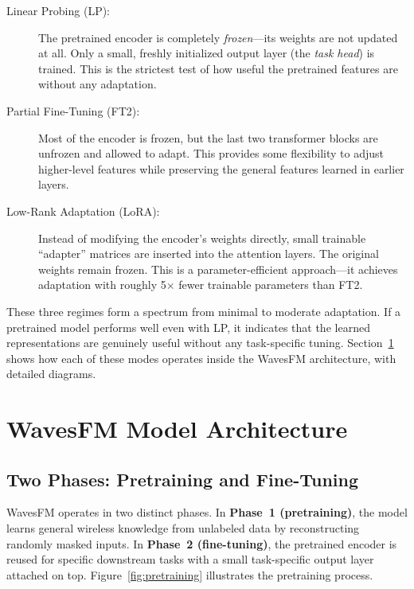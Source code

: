 \documentclass[11pt]{article}
\begin{document}
\begin{description}
    \item[Linear Probing (LP):] The pretrained encoder is completely \textit{frozen}---its weights are not updated at all. Only a small, freshly initialized output layer (the \textit{task head}) is trained. This is the strictest test of how useful the pretrained features are without any adaptation.

    \item[Partial Fine-Tuning (FT2):] Most of the encoder is frozen, but the last two transformer blocks are unfrozen and allowed to adapt. This provides some flexibility to adjust higher-level features while preserving the general features learned in earlier layers.

    \item[Low-Rank Adaptation (LoRA):] Instead of modifying the encoder's weights directly, small trainable ``adapter'' matrices are inserted into the attention layers. The original weights remain frozen. This is a parameter-efficient approach---it achieves adaptation with roughly 5$\times$ fewer trainable parameters than FT2.
\end{description}

These three regimes form a spectrum from minimal to moderate adaptation. If a pretrained model performs well even with LP, it indicates that the learned representations are genuinely useful without any task-specific tuning. Section~\ref{sec:architecture} shows how each of these modes operates inside the WavesFM architecture, with detailed diagrams.

\section{WavesFM Model Architecture}
\label{sec:architecture}

\subsection{Two Phases: Pretraining and Fine-Tuning}

WavesFM operates in two distinct phases. In \textbf{Phase~1 (pretraining)}, the model learns general wireless knowledge from unlabeled data by reconstructing randomly masked inputs. In \textbf{Phase~2 (fine-tuning)}, the pretrained encoder is reused for specific downstream tasks with a small task-specific output layer attached on top. Figure~\ref{fig:pretraining} illustrates the pretraining process.
\end{document}
